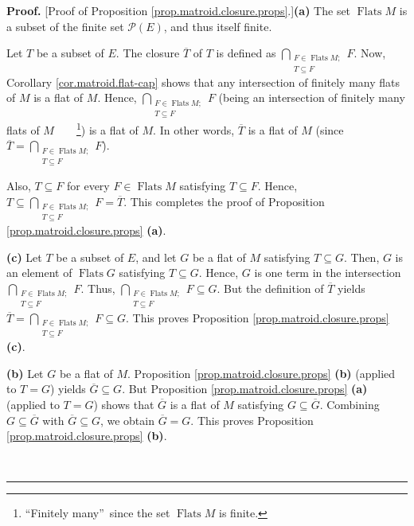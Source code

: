 \documentclass[numbers=enddot,12pt,final,onecolumn,notitlepage]{scrartcl}%
\theoremstyle{definition}
\newenvironment{proof}[1][Proof]{\noindent\textbf{#1.} }{\ \rule{0.5em}{0.5em}}
\let\bigcapnonlimits\bigcap
\renewcommand{\bigcap}{\bigcapnonlimits\limits}
\begin{document}
\begin{proof}
[Proof of Proposition \ref{prop.matroid.closure.props}.]\textbf{(a)} The set
$\operatorname*{Flats}M$ is a subset of the finite set $\mathcal{P}\left(
E\right)  $, and thus itself finite.

Let $T$ be a subset of $E$. The closure $\overline{T}$ of $T$ is defined as
$\bigcap_{\substack{F\in\operatorname*{Flats}M;\\T\subseteq F}}F$. Now,
Corollary \ref{cor.matroid.flat-cap} shows that any intersection of finitely
many flats of $M$ is a flat of $M$. Hence, $\bigcap_{\substack{F\in
\operatorname*{Flats}M;\\T\subseteq F}}F$ (being an intersection of finitely
many flats of $M$\ \ \ \ \footnote{\textquotedblleft Finitely
many\textquotedblright\ since the set $\operatorname*{Flats}M$ is finite.}) is
a flat of $M$. In other words, $\overline{T}$ is a flat of $M$ (since
$\overline{T}=\bigcap_{\substack{F\in\operatorname*{Flats}M;\\T\subseteq F}}F$).

Also, $T\subseteq F$ for every $F\in\operatorname*{Flats}M$ satisfying
$T\subseteq F$. Hence, $T\subseteq\bigcap_{\substack{F\in\operatorname*{Flats}%
M;\\T\subseteq F}}F=\overline{T}$. This completes the proof of Proposition
\ref{prop.matroid.closure.props} \textbf{(a)}.

\textbf{(c)} Let $T$ be a subset of $E$, and let $G$ be a flat of $M$
satisfying $T\subseteq G$. Then, $G$ is an element of $\operatorname*{Flats}G$
satisfying $T\subseteq G$. Hence, $G$ is one term in the intersection
$\bigcap_{\substack{F\in\operatorname*{Flats}M;\\T\subseteq F}}F$. Thus,
$\bigcap_{\substack{F\in\operatorname*{Flats}M;\\T\subseteq F}}F\subseteq G$.
But the definition of $\overline{T}$ yields $\overline{T}=\bigcap
_{\substack{F\in\operatorname*{Flats}M;\\T\subseteq F}}F\subseteq G$. This
proves Proposition \ref{prop.matroid.closure.props} \textbf{(c)}.

\textbf{(b)} Let $G$ be a flat of $M$. Proposition
\ref{prop.matroid.closure.props} \textbf{(b)} (applied to $T=G$) yields
$\overline{G}\subseteq G$. But Proposition \ref{prop.matroid.closure.props}
\textbf{(a)} (applied to $T=G$) shows that $\overline{G}$ is a flat of $M$
satisfying $G\subseteq\overline{G}$. Combining $G\subseteq\overline{G}$ with
$\overline{G}\subseteq G$, we obtain $\overline{G}=G$. This proves Proposition
\ref{prop.matroid.closure.props} \textbf{(b)}.


\end{proof}
\end{document}
